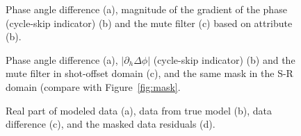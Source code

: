 \begin{figure}
\centering
  \caption{Phase angle difference (a), magnitude of the gradient of the phase (cycle-skip indicator) (b) and the mute filter (c) based on attribute (b).}
\end{figure}


\begin{figure}
\centering


  \caption{Phase angle difference (a), $\left|\partial_h \Delta \phi \right |$ (cycle-skip indicator) (b) and the mute filter in 
shot-offset domain (c), and the same mask in the S-R domain (compare with Figure~\ref{fig:mask}.}
\end{figure}



\begin{figure}
\centering


  \caption{Real part of modeled data (a), data from true model (b), data difference (c),
   and the masked data residuals (d).}
\end{figure}


